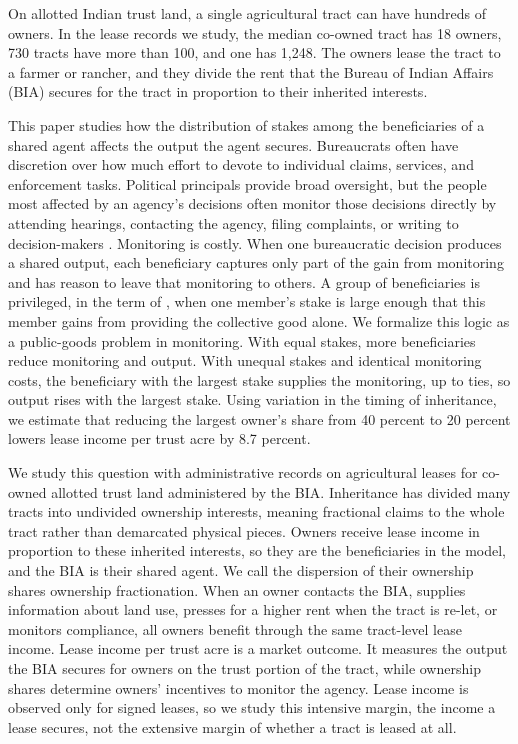 \documentclass[12pt]{article}
\begin{document}
On allotted Indian trust land, a single agricultural tract can have hundreds of owners. In the lease records we study, the median co-owned tract has 18 owners, 730 tracts have more than 100, and one has 1,248. The owners lease the tract to a farmer or rancher, and they divide the rent that the Bureau of Indian Affairs (BIA) secures for the tract in proportion to their inherited interests.

This paper studies how the distribution of stakes among the beneficiaries of a shared agent affects the output the agent secures. Bureaucrats often have discretion over how much effort to devote to individual claims, services, and enforcement tasks. Political principals provide broad oversight, but the people most affected by an agency's decisions often monitor those decisions directly by attending hearings, contacting the agency, filing complaints, or writing to decision-makers \citep{Wilson1989}. Monitoring is costly. When one bureaucratic decision produces a shared output, each beneficiary captures only part of the gain from monitoring and has reason to leave that monitoring to others. A group of beneficiaries is privileged, in the term of \citet{Olson1965}, when one member's stake is large enough that this member gains from providing the collective good alone. We formalize this logic as a public-goods problem in monitoring. With equal stakes, more beneficiaries reduce monitoring and output. With unequal stakes and identical monitoring costs, the beneficiary with the largest stake supplies the monitoring, up to ties, so output rises with the largest stake. Using variation in the timing of inheritance, we estimate that reducing the largest owner's share from 40 percent to 20 percent lowers lease income per trust acre by 8.7 percent.

We study this question with administrative records on agricultural leases for co-owned allotted trust land administered by the BIA. Inheritance has divided many tracts into undivided ownership interests, meaning fractional claims to the whole tract rather than demarcated physical pieces. Owners receive lease income in proportion to these inherited interests, so they are the beneficiaries in the model, and the BIA is their shared agent. We call the dispersion of their ownership shares ownership fractionation. When an owner contacts the BIA, supplies information about land use, presses for a higher rent when the tract is re-let, or monitors compliance, all owners benefit through the same tract-level lease income. Lease income per trust acre is a market outcome. It measures the output the BIA secures for owners on the trust portion of the tract, while ownership shares determine owners' incentives to monitor the agency. Lease income is observed only for signed leases, so we study this intensive margin, the income a lease secures, not the extensive margin of whether a tract is leased at all.
\end{document}
